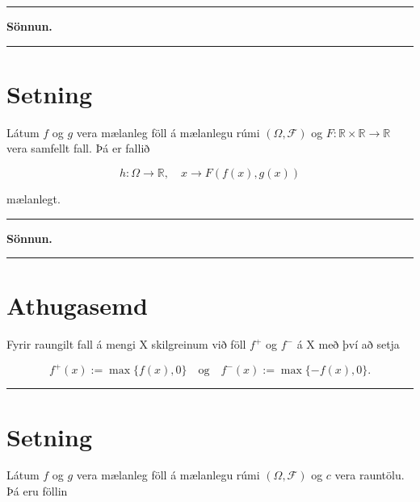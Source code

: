 \documentclass[]{book}
\begin{document}
\begin{center}\rule{0.5\linewidth}{\linethickness}\end{center}

\textbf{Sönnun.}

\begin{center}\rule{0.5\linewidth}{\linethickness}\end{center}

\hypertarget{setning-33}{%
\section{Setning}\label{setning-33}}

Látum \(f\) og \(g\) vera mælanleg föll á mælanlegu rúmi \((\Omega, \mathcal F)\) og \(F: \mathbb R \times \mathbb R \rightarrow \mathbb R\) vera samfellt fall. Þá er fallið

\[
h: \Omega \rightarrow\mathbb R, \quad x\rightarrow F(f(x), g(x))
\]

mælanlegt.

\begin{center}\rule{0.5\linewidth}{\linethickness}\end{center}

\textbf{Sönnun.}

\begin{center}\rule{0.5\linewidth}{\linethickness}\end{center}

\hypertarget{athugasemd-3}{%
\section{Athugasemd}\label{athugasemd-3}}

Fyrir raungilt fall á mengi X skilgreinum við föll \(f^+\) og \(f^-\) á X með því að setja

\[
f^+(x) := \max\{f(x), 0\} \quad \text{og} \quad f^-(x) := \max\{-f(x), 0\}.
\]

\begin{center}\rule{0.5\linewidth}{\linethickness}\end{center}

\hypertarget{setning-34}{%
\section{Setning}\label{setning-34}}

Látum \(f\) og \(g\) vera mælanleg föll á mælanlegu rúmi \((\Omega, \mathcal F)\) og \(c\) vera rauntölu. Þá eru föllin
\end{document}
